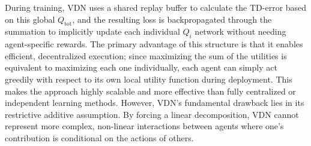 During training, VDN uses a shared replay buffer to calculate the TD-error based on this global $Q_{\text{tot}}$, and the resulting loss is backpropagated through the summation to implicitly update each individual $Q_i$ network without needing agent-specific rewards. The primary advantage of this structure is that it enables efficient, decentralized execution; since maximizing the sum of the utilities is equivalent to maximizing each one individually, each agent can simply act greedily with respect to its own local utility function during deployment. This makes the approach highly scalable and more effective than fully centralized or independent learning methods. However, VDN's fundamental drawback lies in its restrictive additive assumption. By forcing a linear decomposition, VDN cannot represent more complex, non-linear interactions between agents where one's contribution is conditional on the actions of others.


